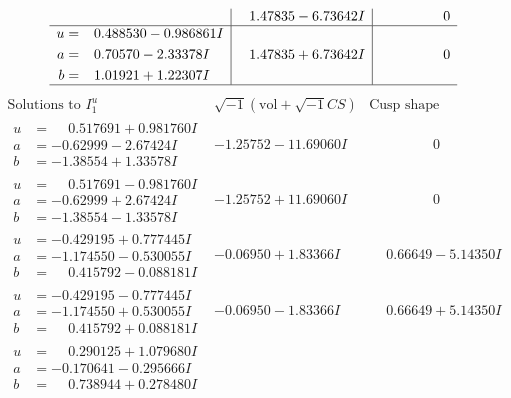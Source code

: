 \documentclass[1p]{elsarticle_modified}
\theoremstyle{definition}
\newcommand{\I}{\sqrt{-1}}
\begin{document}
$$\begin{array}{c|c|c}
 & \phantom{-}1.47835 - 6.73642 I & \phantom{-0.000000 } 0 \\ \hline\begin{aligned}
u &= \phantom{-}0.488530 - 0.986861 I \\
a &= \phantom{-}0.70570 - 2.33378 I \\
b &= \phantom{-}1.01921 + 1.22307 I\end{aligned}
 & \phantom{-}1.47835 + 6.73642 I & \phantom{-0.000000 } 0\\
 \hline 
 \end{array}$$\newpage$$\begin{array}{c|c|c}  
\text{Solutions to }I^u_{1}& \I (\text{vol} + \sqrt{-1}CS) & \text{Cusp shape}\\
 \hline 
\begin{aligned}
u &= \phantom{-}0.517691 + 0.981760 I \\
a &= -0.62999 - 2.67424 I \\
b &= -1.38554 + 1.33578 I\end{aligned}
 & -1.25752 - 11.69060 I & \phantom{-0.000000 } 0 \\ \hline\begin{aligned}
u &= \phantom{-}0.517691 - 0.981760 I \\
a &= -0.62999 + 2.67424 I \\
b &= -1.38554 - 1.33578 I\end{aligned}
 & -1.25752 + 11.69060 I & \phantom{-0.000000 } 0 \\ \hline\begin{aligned}
u &= -0.429195 + 0.777445 I \\
a &= -1.174550 - 0.530055 I \\
b &= \phantom{-}0.415792 - 0.088181 I\end{aligned}
 & -0.06950 + 1.83366 I & \phantom{-}0.66649 - 5.14350 I \\ \hline\begin{aligned}
u &= -0.429195 - 0.777445 I \\
a &= -1.174550 + 0.530055 I \\
b &= \phantom{-}0.415792 + 0.088181 I\end{aligned}
 & -0.06950 - 1.83366 I & \phantom{-}0.66649 + 5.14350 I \\ \hline\begin{aligned}
u &= \phantom{-}0.290125 + 1.079680 I \\
a &= -0.170641 - 0.295666 I \\
b &= \phantom{-}0.738944 + 0.278480 I\end{aligned}

\end{array}$$
\end{document}
